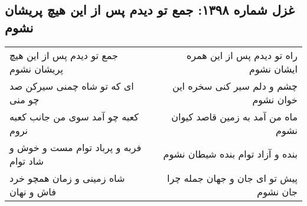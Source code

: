 \begin{center}
\section*{غزل شماره ۱۳۹۸: جمع تو دیدم پس از این هیچ پریشان نشوم}
\label{sec:1398}
\begin{longtable}{l p{0.5cm} r}
جمع تو دیدم پس از این هیچ پریشان نشوم
&&
راه تو دیدم پس از این همره ایشان نشوم
\\
ای که تو شاه چمنی سیرکن صد چو منی
&&
چشم و دلم سیر کنی سخره این خوان نشوم
\\
کعبه چو آمد سوی من جانب کعبه نروم
&&
ماه من آمد به زمین قاصد کیوان نشوم
\\
فربه و پرباد توام مست و خوش و شاد توام
&&
بنده و آزاد توام بنده شیطان نشوم
\\
شاه زمینی و زمان همچو خرد فاش و نهان
&&
پیش تو ای جان و جهان جمله چرا جان نشوم
\\
\end{longtable}
\end{center}
